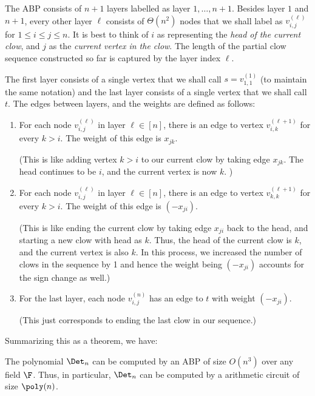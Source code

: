 The ABP consists of $n+1$ layers labelled as layer $1,\dots, n+1$. 
Besides layer $1$ and $n+1$, every other layer $\ell$ consists of $\Theta(n^2)$ nodes that we shall label as $v_{i,j}^{(\ell)}$ for $1\leq i\leq j\leq n$. 
It is best to think of $i$ as representing the \emph{head of the current clow}, and $j$ as the \emph{current vertex in the clow}. 
The length of the partial clow sequence constructed so far is captured by the layer index $\ell$. 

The first layer consists of a single vertex that we shall call $s = v_{1,1}^{(1)}$ (to maintain the same notation)  and the last layer consists of a single vertex that we shall call $t$. 
The edges between layers, and the weights are defined as follows:

\begin{enumerate}
\item For each node $v_{i,j}^{(\ell)}$ in layer $\ell \in [n]$, there is an edge to vertex $v_{i,k}^{(\ell+1)}$ for every $k > i$. 
The weight of this edge is $x_{jk}$. 

(This is like adding vertex $k > i$ to our current clow by taking edge $x_{jk}$. 
The head continues to be $i$, and the current vertex is now $k$. )
\item For each node $v_{i,j}^{(\ell)}$ in layer $\ell \in [n]$, there is an edge to vertex $v_{k,k}^{(\ell+1)}$ for every $k > i$. 
The weight of this edge is $(-x_{ji})$. 

(This is like ending the current clow by taking edge $x_{ji}$ back to the head, and starting a new clow with head as $k$. 
Thus, the head of the current clow is $k$, and the current vertex is also $k$. 
In this process, we increased the number of clows in the sequence by 1 and hence the weight being $(-x_{ji})$ accounts for the sign change as well.)

\item For the last layer, each node $v_{i,j}^{(n)}$ has an edge to $t$ with weight $(-x_{ji})$. 

(This just corresponds to ending the last clow in our sequence.)
\end{enumerate}


\noindent
Summarizing this as a theorem, we have:

\begin{theorem}[\cite{mv97}]\label{thm:det-abp}
The polynomial $\Det_n$ can be computed by an ABP of size $O(n^3)$ over any field $\F$. 
Thus, in particular, $\Det_n$ can be computed by a arithmetic circuit of size $\poly(n)$. 
\end{theorem}


